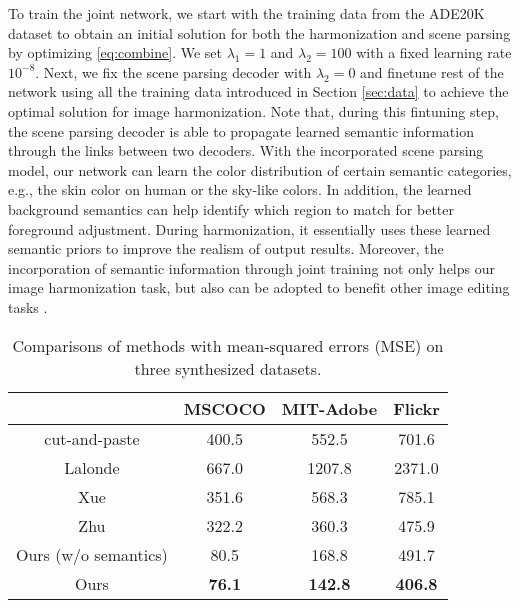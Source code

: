 \documentclass[10pt,twocolumn,letterpaper]{article}
\begin{document}
To train the joint network, we start with the training data from the ADE20K dataset to obtain an initial solution for both the harmonization and scene parsing by optimizing \eqref{eq:combine}.
%
We set $\lambda_1 = 1$ and $\lambda_2 = 100$ with a fixed learning rate $10^{-8}$.
%
Next, we  fix the scene parsing decoder with $\lambda_2 = 0$ and finetune rest of the network using all the training data introduced in Section \ref{sec:data} to achieve the optimal solution for image harmonization.
%
Note that, during this fintuning step, the scene parsing decoder is able to propagate learned semantic information through the links between two decoders.
%
{}
%
With the incorporated scene parsing model, our network can learn the color distribution of certain semantic categories, e.g., the skin color on human or the sky-like colors.
%
In addition, the learned background semantics can help identify which region to match for better foreground adjustment.
%
During harmonization, it essentially uses these learned semantic priors to improve the realism of output results.
%
Moreover, the incorporation of semantic information through joint training not only helps our image harmonization task, but also can be adopted to benefit other image editing tasks \cite{Zhang_ECCV_2016, Pathak_CVPR_2016}.
%
\begin{table}[t]
	\caption{Comparisons of methods with mean-squared errors (MSE) on three synthesized datasets.
	}
	\vspace{1mm}
	\small
	\centering
	\renewcommand{\arraystretch}{1.5}
	\setlength{\tabcolsep}{6pt}     
	\begin{tabular}{|c|c|c|c|}
		\hline
		& MSCOCO & MIT-Adobe & Flickr \\
		\hline
		\vspace{-2mm}
		
		cut-and-paste & 400.5 & 552.5 & 701.6 \\
		\vspace{-2mm}
		
		Lalonde \cite{Lalonde_ICCV_2007} & 667.0 & 1207.8 & 2371.0 \\
		\vspace{-2mm}
		
		Xue \cite{Xue_siggraph_2012} & 351.6 & 568.3 & 785.1 \\
		\vspace{-2mm}
		
		Zhu \cite{Zhu_ICCV_2015} & 322.2 & 360.3 & 475.9 \\
		\vspace{-2mm}
		
		Ours (w/o semantics) & 80.5 & 168.8 & 491.7 \\
		
		Ours & \textbf{76.1} & \textbf{142.8} & \textbf{406.8} \\
		
		\hline
	\end{tabular}
	\label{tab:mse}
	\vspace{-2mm}
\end{table}
%
%
\end{document}
